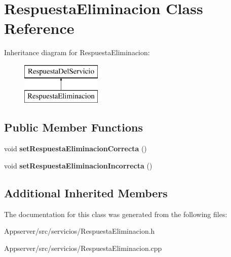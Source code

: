 \hypertarget{classRespuestaEliminacion}{}\section{Respuesta\+Eliminacion Class Reference}
\label{classRespuestaEliminacion}
Inheritance diagram for Respuesta\+Eliminacion\+:\begin{figure}[H]
\begin{center}
\leavevmode
\includegraphics[height=2.000000cm]{classRespuestaEliminacion}
\end{center}
\end{figure}
\subsection*{Public Member Functions}
\begin{DoxyCompactItemize}
\item 
void {\bfseries set\+Respuesta\+Eliminacion\+Correcta} ()\hypertarget{classRespuestaEliminacion_a325283366c4fa4aeb1cf754a69c13276}{}\label{classRespuestaEliminacion_a325283366c4fa4aeb1cf754a69c13276}

\item 
void {\bfseries set\+Respuesta\+Eliminacion\+Incorrecta} ()\hypertarget{classRespuestaEliminacion_a50e939dbaf3e9be150319fc9a0581aa3}{}\label{classRespuestaEliminacion_a50e939dbaf3e9be150319fc9a0581aa3}

\end{DoxyCompactItemize}
\subsection*{Additional Inherited Members}


The documentation for this class was generated from the following files\+:\begin{DoxyCompactItemize}
\item 
Appserver/src/servicios/Respuesta\+Eliminacion.\+h\item 
Appserver/src/servicios/Respuesta\+Eliminacion.\+cpp\end{DoxyCompactItemize}
